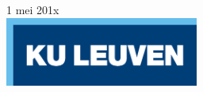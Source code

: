 \begin{titlepage}


{\large 1 mei 201x}\\[2cm] %


\includegraphics[width=2.5in]{logokuleuven.png}\\[1cm] %
 

\vfill %

\end{titlepage}
